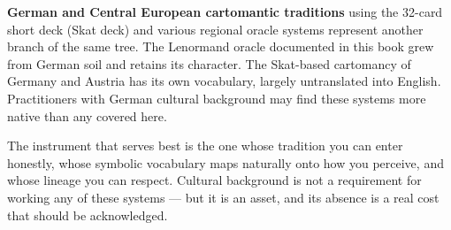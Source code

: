 \textbf{German and Central European cartomantic traditions} using the 32-card short deck (Skat deck) and various regional oracle systems represent another branch of the same tree. The Lenormand oracle documented in this book grew from German soil and retains its character. The Skat-based cartomancy of Germany and Austria has its own vocabulary, largely untranslated into English. Practitioners with German cultural background may find these systems more native than any covered here.

The instrument that serves best is the one whose tradition you can enter honestly, whose symbolic vocabulary maps naturally onto how you perceive, and whose lineage you can respect. Cultural background is not a requirement for working any of these systems --- but it is an asset, and its absence is a real cost that should be acknowledged.
